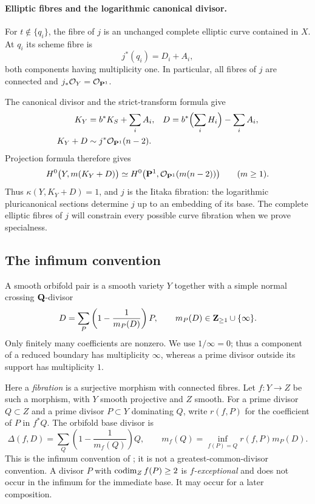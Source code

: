 \paragraph{Elliptic fibres and the logarithmic canonical divisor.}
For $t\notin\{q_i\}$, the fibre of $j$ is an unchanged complete elliptic
curve contained in $X$. At $q_i$ its scheme fibre is
\begin{equation}\label{eq:j-fibre}
 j^*(q_i)=D_i+A_i,
\end{equation}
both components having multiplicity one. In particular, all fibres of
$j$ are connected and $j_*\mathcal O_Y=\mathcal O_{\mathbf P^1}$.

The canonical divisor and the strict-transform formula give
\begin{align}
 K_Y&=b^*K_S+\sum_iA_i, &
 D&=b^*\Bigl(\sum_iH_i\Bigr)-\sum_iA_i,\nonumber\\
 K_Y+D&\sim j^*\mathcal O_{\mathbf P^1}(n-2).\label{eq:log-canonical}
\end{align}
Projection formula therefore gives
\[
 H^0\bigl(Y,m(K_Y+D)\bigr)
   \simeq H^0\bigl(\mathbf P^1,\mathcal O_{\mathbf P^1}(m(n-2))\bigr)
 \qquad(m\geq1).
\]
Thus $\kappa(Y,K_Y+D)=1$, and $j$ is the Iitaka fibration: the
logarithmic pluricanonical sections determine $j$ up to an embedding of
its base. The complete elliptic fibres of $j$ will constrain every
possible curve fibration when we prove specialness.

\subsection{The infimum convention}
A smooth orbifold pair is a smooth variety $Y$
together with a simple normal crossing $\mathbf Q$-divisor
\[
 D=\sum_P\left(1-\frac1{m_P(D)}\right)P,
 \qquad m_P(D)\in\mathbf Z_{\geq1}\cup\{\infty\}.
\]
Only finitely many coefficients are nonzero. We use $1/\infty=0$;
thus a component of a reduced boundary has multiplicity $\infty$, whereas
a prime divisor outside its support has multiplicity $1$.

Here a \emph{fibration} is a surjective morphism with connected fibres.
Let $f:Y\to Z$ be such a morphism, with $Y$ smooth projective and $Z$
smooth. For a prime divisor $Q\subset Z$ and a prime divisor $P\subset Y$
dominating $Q$, write $r(f,P)$ for the coefficient of $P$ in $f^*Q$.
The orbifold base divisor is
\begin{equation}\label{eq:infimum}
 \Delta(f,D)=\sum_Q\left(1-\frac1{m_f(Q)}\right)Q,
 \qquad
 m_f(Q)=\inf_{f(P)=Q}r(f,P)m_P(D).
\end{equation}
This is the infimum convention of
\cite[Definition 2.1]{CDHP2026}; it is not a greatest-common-divisor
convention. A divisor $P$ with $\operatorname{codim}_Zf(P)\geq2$ is
\emph{$f$-exceptional} and does not occur in the infimum for the immediate
base. It may occur for a later composition.

